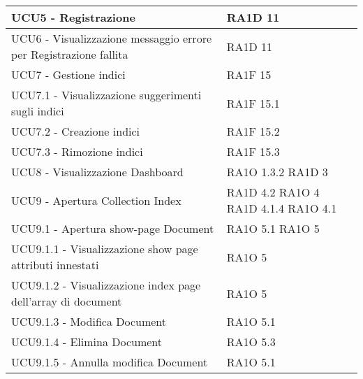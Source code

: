 \begin{center}
\begin{longtable}{ | p{5cm} | p{5cm} |}
            UCU5 - Registrazione &  RA1D 11 \newline  \\ \hline      
            UCU6 - Visualizzazione messaggio errore per Registrazione fallita &  RA1D 11 \newline  \\ \hline      
            UCU7 - Gestione indici &  RA1F 15 \newline  \\ \hline      
            UCU7.1 - Visualizzazione suggerimenti sugli indici &  RA1F 15.1 \newline  \\ \hline      
            UCU7.2 - Creazione indici &  RA1F 15.2 \newline  \\ \hline      
            UCU7.3 - Rimozione indici &  RA1F 15.3 \newline  \\ \hline      
            UCU8 - Visualizzazione Dashboard &  RA1O 1.3.2 \newline  RA1D 3  \newline  \\ \hline      
            UCU9 - Apertura Collection Index &  RA1D 4.2  \newline  RA1O 4 \newline  RA1D 4.1.4  \newline  RA1O 4.1  \newline  \\ \hline      
            UCU9.1 - Apertura show-page Document &  RA1O 5.1 \newline  RA1O 5  \newline  \\ \hline      
            UCU9.1.1 -  Visualizzazione show page attributi innestati &  RA1O 5  \newline  \\ \hline      
            UCU9.1.2 - Visualizzazione index page dell'array di document &  RA1O 5  \newline  \\ \hline      
            UCU9.1.3 - Modifica Document &  RA1O 5.1 \newline  \\ \hline      
            UCU9.1.4 - Elimina Document &  RA1O 5.3 \newline  \\ \hline      
            UCU9.1.5 - Annulla modifica Document &  RA1O 5.1 \newline  \\ \hline      

\end{longtable}
\end{center}
